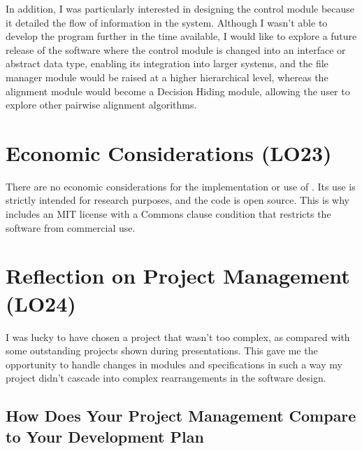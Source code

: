 \documentclass{article}
\begin{document}
In addition, I was particularly interested in designing the control module because 
it detailed the flow of information in the system. Although I wasn't able to develop the 
program further in the time available, I would like to explore a future release of the software 
where the control module is changed into an interface or abstract data type, enabling its 
integration into larger systems, and the file manager module would be raised at a higher hierarchical level, 
whereas the alignment module would become a Decision Hiding module, allowing the user to 
explore other pairwise alignment algorithms.


\section{Economic Considerations (LO23)}

There are no economic considerations for the implementation or use of \progname{}.
Its use is strictly intended for research purposes, and the code is open source. 
This is why \progname{} includes an MIT license with a Commons clause condition that 
restricts the software from commercial use. 

\section{Reflection on Project Management (LO24)}

I was lucky to have chosen a project that wasn't too complex, as compared with 
some outstanding projects shown during presentations. This gave me the opportunity 
to handle changes in modules and specifications in such a way my project didn't cascade into 
complex rearrangements in the software design.

\subsection{How Does Your Project Management Compare to Your Development Plan}
\end{document}
